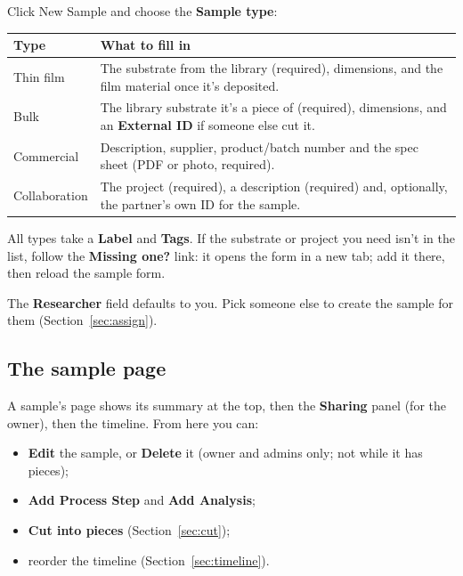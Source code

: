 \documentclass[11pt,a4paper]{article}
\newcommand{\ui}[1]{\textsf{\textbf{#1}}}
\newcommand{\menu}[1]{\textsf{#1}}
\begin{document}
Click \menu{New Sample} and choose the \ui{Sample type}:

\begin{center}
\begin{tabularx}{\linewidth}{@{}lX@{}}
\toprule
\textbf{Type} & \textbf{What to fill in} \\
\midrule
Thin film     & The substrate from the library (required), dimensions, and the
                film material once it's deposited. \\
Bulk          & The library substrate it's a piece of (required), dimensions,
                and an \ui{External ID} if someone else cut it. \\
Commercial    & Description, supplier, product/batch number and the spec sheet
                (PDF or photo, required). \\
Collaboration & The project (required), a description (required) and, optionally,
                the partner's own ID for the sample. \\
\bottomrule
\end{tabularx}
\end{center}

All types take a \ui{Label} and \ui{Tags}. If the substrate or project you
need isn't in the list, follow the \ui{Missing one?} link: it opens the
form in a new tab; add it there, then reload the sample form.

The \ui{Researcher} field defaults to you. Pick someone else to create the
sample for them (Section~\ref{sec:assign}).

\subsection{The sample page}

A sample's page shows its summary at the top, then the \ui{Sharing} panel
(for the owner), then the timeline. From here you can:
\begin{itemize}
  \item \ui{Edit} the sample, or \ui{Delete} it (owner and admins only; not
        while it has pieces);
  \item \ui{Add Process Step} and \ui{Add Analysis};
  \item \ui{Cut into pieces} (Section~\ref{sec:cut});
  \item reorder the timeline (Section~\ref{sec:timeline}).
\end{itemize}

\end{document}
